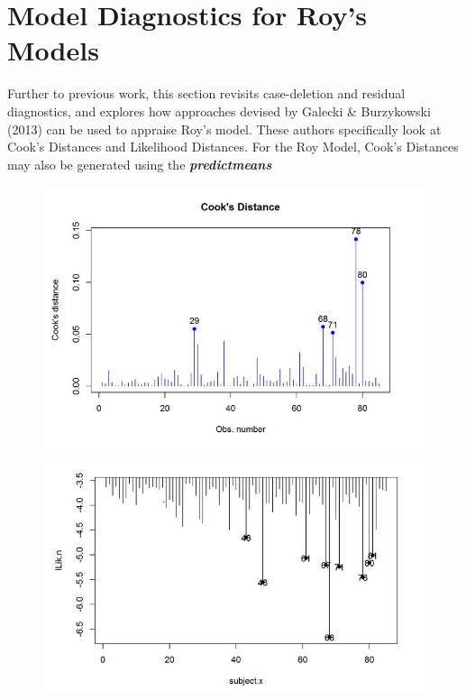 \documentclass[12pt, a4paper]{report}
\theoremstyle{plain}
\theoremstyle{definition}
\theoremstyle{remark}
\begin{document}
\section{Model Diagnostics for Roy's Models}

Further to previous work, this section revisits case-deletion and residual diagnostics, and explores how approaches devised by  Galecki \& Burzykowski (2013) can be used to appraise Roy's model. These authors specifically look at Cook's Distances and Likelihood Distances.
For the Roy Model, Cook's Distances may also be generated using the \textbf{\textit{predictmeans}}



\begin{figure}[h!]
	\centering
	\includegraphics[width=0.7\linewidth]{images/CooksDistancePlot-JS-Roy}
	\caption{}
	\label{fig:CooksDistancePlot-JS-Roy}
\end{figure}

\begin{figure}[h!]
	\centering
	\includegraphics[width=0.7\linewidth]{images/LogLik-JS-Roy}
	\caption{}
	\label{fig:LogLik-JS-Roy}
\end{figure}
\end{document}
